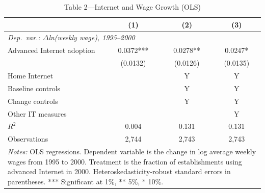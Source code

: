 \begin{table}[htbp]
\centering
\caption{Table 2---Internet and Wage Growth (OLS)}
\label{tab:table2}
\begin{tabular}{lccc}
\toprule
 & (1) & (2) & (3) \\
\midrule
\multicolumn{4}{l}{\textit{Dep.\ var.: $\Delta$ln(weekly wage), 1995--2000}} \\
\addlinespace
Advanced Internet adoption & 0.0372*** & 0.0278** & 0.0247* \\
 & (0.0132) & (0.0126) & (0.0135) \\
\addlinespace
Home Internet & & Y & Y \\
Baseline controls & & Y & Y \\
Change controls & & Y & Y \\
Other IT measures & & & Y \\
\addlinespace
$R^2$ & 0.004 & 0.131 & 0.131 \\
Observations & 2,744 & 2,743 & 2,743 \\
\bottomrule
\multicolumn{4}{p{0.85\linewidth}}{\footnotesize
 \textit{Notes:} OLS regressions. Dependent variable is the change in
 log average weekly wages from 1995 to 2000. Treatment is the fraction
 of establishments using advanced Internet in 2000.
 Heteroskedasticity-robust standard errors in parentheses.
 *** Significant at 1\%, ** 5\%, * 10\%.}
\end{tabular}
\end{table}

